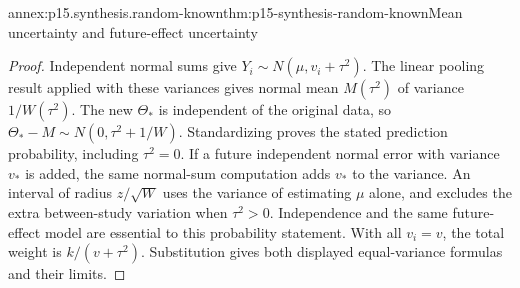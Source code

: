 \begin{annexitem}{annex:p15.synthesis.random-known}{thm:p15-synthesis-random-known}{Mean uncertainty and future-effect uncertainty}
\begin{proof}
Independent normal sums give \(Y_i\sim N(\mu,v_i+\tau^2)\).
The linear pooling result applied with these variances gives normal mean
\(M(\tau^2)\) of variance \(1/W(\tau^2)\).
The new \(\Theta_*\) is independent of the original data, so
\(\Theta_*-M\sim N(0,\tau^2+1/W)\). Standardizing proves the stated
prediction probability, including \(\tau^2=0\). If a future independent
normal error with variance \(v_*\) is added, the same normal-sum computation adds
\(v_*\) to the variance. An interval of radius \(z/\sqrt W\)
uses the variance of estimating \(\mu\) alone, and excludes the extra
between-study variation when \(\tau^2>0\). Independence and the same
future-effect model are essential to this probability statement.
With all \(v_i=v\), the total weight is \(k/(v+\tau^2)\).
Substitution gives both displayed equal-variance formulas and their limits.
\end{proof}
\end{annexitem}

